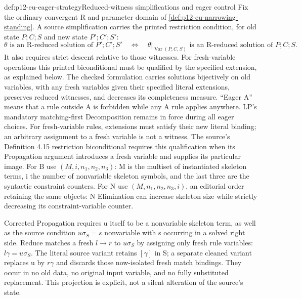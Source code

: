\begin{hbdefinition}{def:p12-eu-eager-strategy}{Reduced-witness simplifications and eager control}
Fix the ordinary convergent R and parameter domain of
\cref{def:p12-eu-narrowing-standing}. A source simplification carries
the printed restriction condition, for old state \(P;C;S\) and
new state \(P';C';S'\):
\[
 \theta\text{ is an R-reduced solution of }P';C';S'
 \quad\Longleftrightarrow\quad
 \theta|_{\operatorname{Var}(P,C,S)}
       \text{ is an R-reduced solution of }P;C;S.
\]
It also requires strict descent relative to those witnesses. For
fresh-variable operations this printed biconditional must be qualified
by the specified extension, as explained below. The checked formulation
carries
solutions bijectively on old variables, with any fresh variables given
their specified literal extensions, preserves reduced witnesses, and
decreases its completeness measure. ``Eager A'' means that a rule
outside A is forbidden while any A rule applies anywhere.
LP's mandatory matching-first Decomposition remains in force during
all eager choices. For fresh-variable rules, extensions must satisfy
their new literal binding; an arbitrary assignment to a fresh variable
is not a witness. The source's Definition 4.15 restriction biconditional
requires this qualification when its Propagation argument introduces
a fresh variable and supplies its particular image.
For B use \((M,i,n_1,n_2,n_3)\): M is the multiset of instantiated
skeleton terms, i the number of nonvariable skeleton symbols, and the
last three are the syntactic constraint counters. For N use
\((M,n_1,n_2,n_3,i)\), an editorial order retaining the same
objects: N Elimination can increase skeleton size while strictly
decreasing its constraint-variable counter.

Corrected Propagation requires u itself to be a nonvariable skeleton
term, as well as the source condition \(u\sigma_S=s\) nonvariable
with s occurring in a solved right side. Reduce matches a fresh
\(l\to r\) to \(u\sigma_S\) by assigning only fresh rule
variables: \(l\gamma=u\sigma_S\). The literal source variant
retains \([\gamma]\) in S; a separate cleaned variant replaces
u by \(r\gamma\) and discards those now-isolated fresh match
bindings. They occur in no old data, no original input variable,
and no fully substituted replacement. This projection is explicit,
not a silent alteration of the source's state.
\cite[Definitions 4.15--4.16 and Reduce, pp.~500--501]{BaaderSnyder2001}
\end{hbdefinition}

